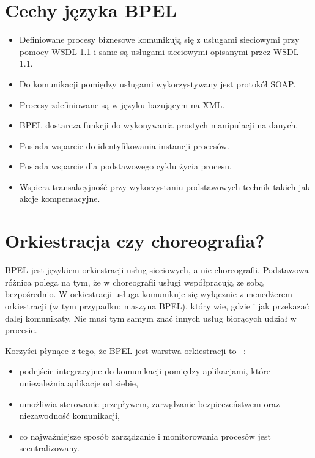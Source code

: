 \section{Cechy języka BPEL}
\label{sec:bpelFeatures}

\begin{itemize}
\item Definiowane procesy biznesowe komunikują się z usługami sieciowymi przy pomocy WSDL 1.1 i same są usługami sieciowymi opisanymi przez WSDL 1.1.  
\item Do komunikacji pomiędzy usługami wykorzystywany jest protokół SOAP.
\item Procesy zdefiniowane są w języku bazującym na XML.
\item BPEL dostarcza funkcji do wykonywania prostych manipulacji na danych.
\item Posiada wsparcie do identyfikowania instancji procesów.
\item Posiada wsparcie dla podstawowego cyklu życia procesu.
\item Wspiera transakcyjność przy wykorzystaniu podstawowych technik takich jak akcje kompensacyjne.
\end{itemize}


\section{Orkiestracja czy choreografia?}
\label{sec:bpelOrchestration}
BPEL jest językiem orkiestracji usług sieciowych, a nie choreografii. Podstawowa różnica polega na tym, że w choreografii usługi współpracują ze sobą bezpośrednio. W orkiestracji usługa komunikuje się wyłącznie z menedżerem orkiestracji (w tym przypadku: maszyna BPEL), który wie, gdzie i jak przekazać dalej komunikaty. Nie musi tym samym znać innych usług biorących udział w procesie. 

Korzyści płynące z tego, że BPEL jest warstwa orkiestracji to ~\cite{wiao}:

\begin{itemize}
\item podejście integracyjne do komunikacji pomiędzy aplikacjami, które uniezależnia aplikacje od siebie,  
\item umożliwia sterowanie przepływem, zarządzanie bezpieczeństwem oraz niezawodność komunikacji,
\item co najważniejsze sposób zarządzanie i monitorowania procesów jest scentralizowany. 
\end{itemize}

